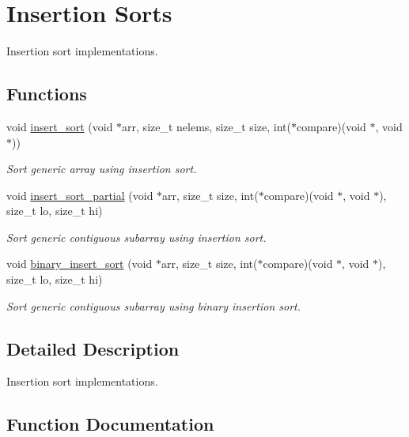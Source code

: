 \hypertarget{group__InsertionSort}{}\section{Insertion Sorts}
\label{group__InsertionSort}


Insertion sort implementations.  


\subsection*{Functions}
\begin{DoxyCompactItemize}
\item 
void \hyperlink{group__InsertionSort_ga0f8cbdee5711f9a401c6a6bc0910e5c9}{insert\+\_\+sort} (void $\ast$arr, size\+\_\+t nelems, size\+\_\+t size, int($\ast$compare)(void $\ast$, void $\ast$))
\begin{DoxyCompactList}\small\item\em Sort generic array using insertion sort. \end{DoxyCompactList}\item 
void \hyperlink{group__InsertionSort_gabab9277ccf9fc7370143131b469142b9}{insert\+\_\+sort\+\_\+partial} (void $\ast$arr, size\+\_\+t size, int($\ast$compare)(void $\ast$, void $\ast$), size\+\_\+t lo, size\+\_\+t hi)
\begin{DoxyCompactList}\small\item\em Sort generic contiguous subarray using insertion sort. \end{DoxyCompactList}\item 
void \hyperlink{group__InsertionSort_ga9955e0e065cbb32f516533e134c437a8}{binary\+\_\+insert\+\_\+sort} (void $\ast$arr, size\+\_\+t size, int($\ast$compare)(void $\ast$, void $\ast$), size\+\_\+t lo, size\+\_\+t hi)
\begin{DoxyCompactList}\small\item\em Sort generic contiguous subarray using binary insertion sort. \end{DoxyCompactList}\end{DoxyCompactItemize}


\subsection{Detailed Description}
Insertion sort implementations. 



\subsection{Function Documentation}
\mbox{\label{group__InsertionSort_ga9955e0e065cbb32f516533e134c437a8}} 
